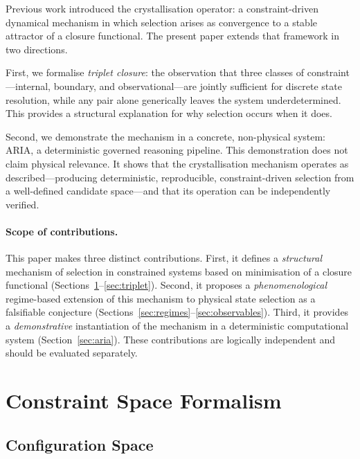 \documentclass[12pt]{article}
\begin{document}
Previous work \citep{Smart2026} introduced the crystallisation operator: a constraint-driven dynamical mechanism in which selection arises as convergence to a stable attractor of a closure functional. The present paper extends that framework in two directions.

First, we formalise \textit{triplet closure}: the observation that three classes of constraint---internal, boundary, and observational---are jointly sufficient for discrete state resolution, while any pair alone generically leaves the system underdetermined. This provides a structural explanation for why selection occurs when it does.

Second, we demonstrate the mechanism in a concrete, non-physical system: ARIA, a deterministic governed reasoning pipeline. This demonstration does not claim physical relevance. It shows that the crystallisation mechanism operates as described---producing deterministic, reproducible, constraint-driven selection from a well-defined candidate space---and that its operation can be independently verified.

\paragraph{Scope of contributions.}
This paper makes three distinct contributions. First, it defines a \textit{structural} mechanism of selection in constrained systems based on minimisation of a closure functional (Sections~\ref{sec:constraints}--\ref{sec:triplet}). Second, it proposes a \textit{phenomenological} regime-based extension of this mechanism to physical state selection as a falsifiable conjecture (Sections~\ref{sec:regimes}--\ref{sec:observables}). Third, it provides a \textit{demonstrative} instantiation of the mechanism in a deterministic computational system (Section~\ref{sec:aria}). These contributions are logically independent and should be evaluated separately.

\section{Constraint Space Formalism}\label{sec:constraints}

\subsection{Configuration Space}
\end{document}
